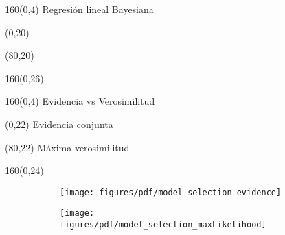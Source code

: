 \documentclass[shownotes,aspectratio=169]{beamer}
\begin{document}
\begin{frame}[plain]
\begin{textblock}{160}(0,4)
\centering  \Large Regresi\'on lineal Bayesiana
\end{textblock}


\begin{textblock}{80}(0,20)
 \centering
\end{textblock}

\begin{textblock}{80}(80,20)
 \centering
\end{textblock}

\begin{textblock}{160}(0,26)
     \centering 
\end{textblock}

\end{frame}

\begin{frame}[plain]
\begin{textblock}{160}(0,4)
 \centering \Large Evidencia vs Verosimilitud
\end{textblock}


\begin{textblock}{80}(0,22)
 \centering
Evidencia conjunta
\end{textblock}

\begin{textblock}{80}(80,22)
 \centering
 M\'axima verosimilitud
\end{textblock}


\begin{textblock}{160}(0,24)
     \centering 
       \begin{figure}[H]     
     \centering 
     \begin{subfigure}[b]{0.47\textwidth}
       \texttt{[image: figures/pdf/model\_selection\_evidence]}
     \end{subfigure}
     \begin{subfigure}[b]{0.49\textwidth}
       \texttt{[image: figures/pdf/model\_selection\_maxLikelihood]}
     \end{subfigure}
\end{figure}
\end{textblock}


\end{frame}
\end{document}
